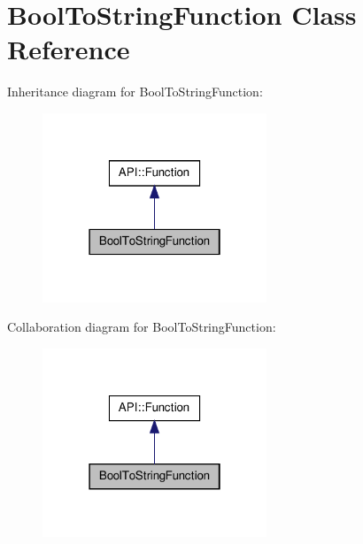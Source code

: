 \hypertarget{class_bool_to_string_function}{\section{Bool\-To\-String\-Function Class Reference}
\label{class_bool_to_string_function}
}


Inheritance diagram for Bool\-To\-String\-Function\-:\nopagebreak
\begin{figure}[H]
\begin{center}
\leavevmode
\includegraphics[width=190pt]{class_bool_to_string_function__inherit__graph}
\end{center}
\end{figure}


Collaboration diagram for Bool\-To\-String\-Function\-:\nopagebreak
\begin{figure}[H]
\begin{center}
\leavevmode
\includegraphics[width=190pt]{class_bool_to_string_function__coll__graph}
\end{center}
\end{figure}
